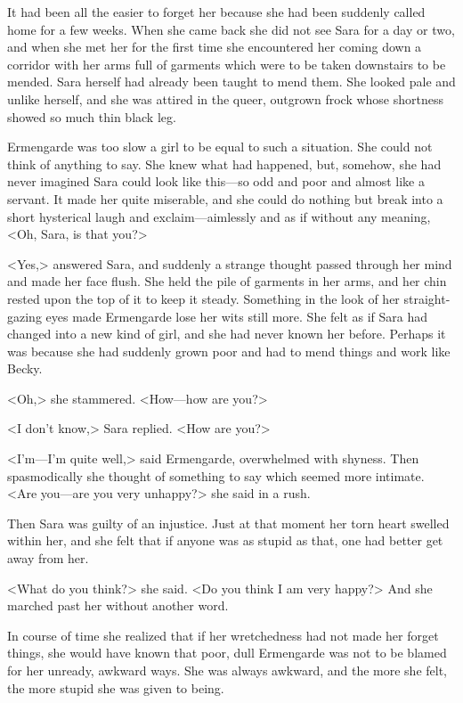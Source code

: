 It had been all the easier to forget her because she had been suddenly called home for a few weeks. When she came back she did not see Sara for a day or two, and when she met her for the first time she encountered her coming down a corridor with her arms full of garments which were to be taken downstairs to be mended. Sara herself had already been taught to mend them. She looked pale and unlike herself, and she was attired in the queer, outgrown frock whose shortness showed so much thin black leg.

Ermengarde was too slow a girl to be equal to such a situation. She could not think of anything to say. She knew what had happened, but, somehow, she had never imagined Sara could look like this—so odd and poor and almost like a servant. It made her quite miserable, and she could do nothing but break into a short hysterical laugh and exclaim—aimlessly and as if without any meaning, <Oh, Sara, is that you?>

<Yes,> answered Sara, and suddenly a strange thought passed through her mind and made her face flush. She held the pile of garments in her arms, and her chin rested upon the top of it to keep it steady. Something in the look of her straight-gazing eyes made Ermengarde lose her wits still more. She felt as if Sara had changed into a new kind of girl, and she had never known her before. Perhaps it was because she had suddenly grown poor and had to mend things and work like Becky.

<Oh,> she stammered. <How—how are you?>

<I don't know,> Sara replied. <How are you?>

<I'm—I'm quite well,> said Ermengarde, overwhelmed with shyness. Then spasmodically she thought of something to say which seemed more intimate. <Are you—are you very unhappy?> she said in a rush.

Then Sara was guilty of an injustice. Just at that moment her torn heart swelled within her, and she felt that if anyone was as stupid as that, one had better get away from her.

<What do you think?> she said. <Do you think I am very happy?> And she marched past her without another word.

In course of time she realized that if her wretchedness had not made her forget things, she would have known that poor, dull Ermengarde was not to be blamed for her unready, awkward ways. She was always awkward, and the more she felt, the more stupid she was given to being.

